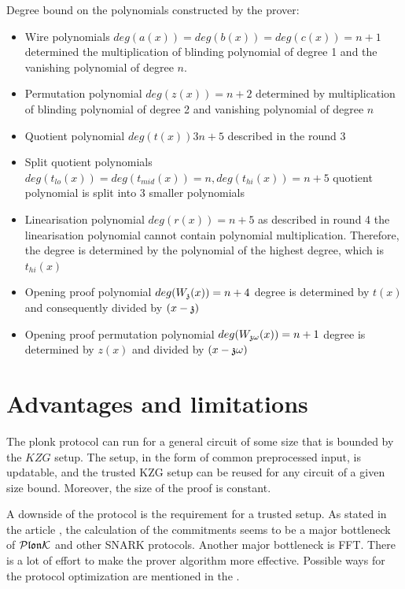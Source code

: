 Degree bound on the polynomials constructed by the prover:
\begin{itemize}
    \item Wire polynomials $deg(a(x)) = deg(b(x)) = deg(c(x)) = n+1$ determined the multiplication of blinding polynomial of degree 1 and the vanishing polynomial of degree $n$.
    \item Permutation polynomial $deg(z(x)) = n+2$ determined by multiplication of blinding polynomial of degree 2 and vanishing polynomial of degree $n$
    \item Quotient polynomial $deg(t(x)) 3n+5$ described in the round 3 
    \item Split quotient polynomials $deg(t_{lo}(x)) = deg(t_{mid}(x)) = n, deg(t_{hi}(x)) = n+5$ quotient polynomial is split into 3 smaller polynomials
    \item Linearisation polynomial $deg(r(x)) = n+5$ as described in round 4  the linearisation polynomial cannot contain polynomial multiplication. Therefore, the degree is determined by the polynomial of the highest degree, which is $t_{hi}(x)$
    \item Opening proof polynomial $deg(W_{\mathfrak{z}}(x)) = n+4$ degree is determined by $t(x)$ and consequently divided by $(x - \mathfrak{z})$
    \item Opening proof permutation polynomial $deg(W_{\mathfrak{z}\omega}(x)) = n+1$ degree is determined by $z(x)$ and divided by $(x - \mathfrak{z}\omega)$
\end{itemize}

\section{Advantages and limitations}

The plonk protocol can run for a general circuit of some size that is bounded by the $KZG$ setup. The setup, in the form of common preprocessed input, is updatable, and the trusted KZG setup can be reused for any circuit of a given size bound. Moreover, the size of the proof is constant. 

A downside of the protocol is the requirement for a trusted setup. As stated in the article \cite{pipeMSM}, the calculation of the commitments seems to be a major bottleneck of $\mathcal{P}\mathfrak{lon}\mathcal{K}$ and other SNARK protocols. Another major bottleneck is FFT. There is a lot of effort to make the prover algorithm more effective. Possible ways for the protocol optimization are mentioned in the . 



